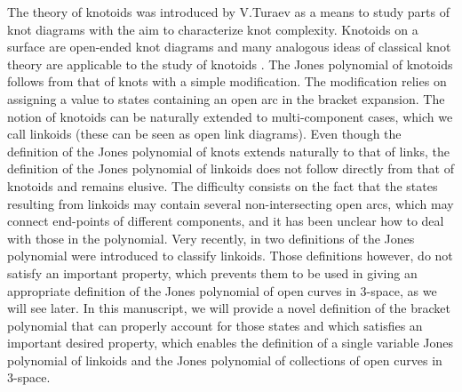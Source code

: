 \documentclass{article}
\begin{document}
The theory of knotoids was introduced by V.Turaev \cite{Turaev2012} as a means to study parts of knot diagrams with the aim to characterize knot complexity. Knotoids on a surface are open-ended knot diagrams and many analogous ideas of classical knot theory are applicable to the study of knotoids \cite{Gugumcu2017,Gugumcu2017b,Gugumcu2019, Manouras2021}. The Jones polynomial of knotoids follows from that of knots with a simple modification. The modification relies on assigning a value to states containing an open arc in the bracket expansion. The notion of knotoids can be naturally extended to multi-component cases, which we call linkoids (these can be seen as open link diagrams). Even though the definition of the Jones polynomial of knots extends naturally to that of links, the definition of the Jones polynomial of linkoids does not follow directly from that of knotoids and remains elusive. The difficulty consists on the fact that the states resulting from linkoids may contain several non-intersecting open arcs, which may connect end-points of different components, and it has been unclear how to deal with those in the polynomial. Very recently, in \cite{Neslihan2022} two definitions of the Jones polynomial were introduced to classify linkoids. Those definitions however, do not satisfy an important property, which prevents them to be used in giving an appropriate definition of the Jones polynomial of open curves in 3-space, as we will see later. In this manuscript, we will provide a novel definition of the bracket polynomial that can properly account for those states and which satisfies an important desired property, which enables the definition of a single variable Jones polynomial of linkoids and the Jones polynomial of collections of open curves in 3-space.


\end{document}
